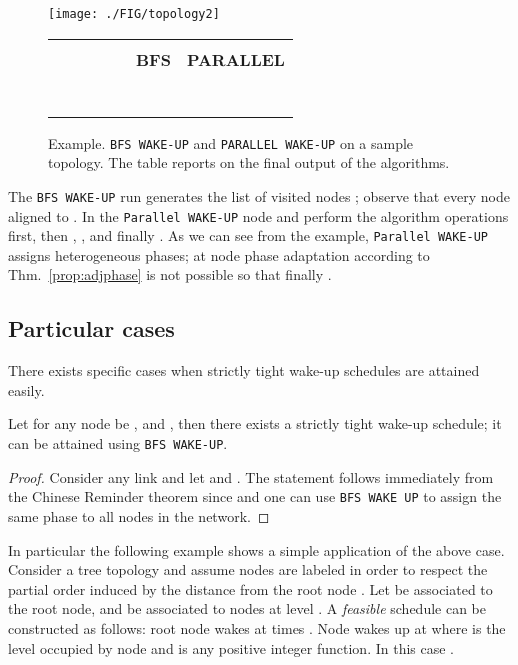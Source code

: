 \begin{figure*}[t]
\centering
\begin{minipage}{4cm}
\texttt{[image: ./FIG/topology2]}
\end{minipage}
\begin{minipage}{4cm}{\begin{tabular}{|l|c|c|c|c|c|c|}
\hline
\textbf{ } & \textbf{} & \textbf{}& \textbf{}& \textbf{}&\textbf{}& \textbf{}\\
&  &   & &  &\textbf{BFS} & \textbf{PARALLEL}\\
\hline
\hline
 &  & & &  &  & \\
 &  & & &  &  & \\
 &   & & & &  & \\
 &  & & &   &  & \\
 &   & & &  &  & \\
 &   & & &  &  & \\
 &   & & &  &  & \\
\hline
\end{tabular}
}\end{minipage}
\caption{Example. {\tt BFS WAKE-UP} and {\tt PARALLEL WAKE-UP} on a sample topology. The table reports on the final output of the algorithms.}\label{fig:example}
\end{figure*}

The {\tt BFS WAKE-UP} run generates the list of visited 
nodes ; observe that every node aligned to 
. In the {\tt Parallel WAKE-UP} node  and  perform 
 the algorithm operations first, then , ,  and finally . 
As we can see from the example, {\tt Parallel WAKE-UP} assigns 
heterogeneous phases; at node  phase adaptation according 
to Thm.~\ref{prop:adjphase} is not possible so that finally 
.


\subsection{Particular cases}\label{sec:particular}


There exists specific cases when strictly tight wake-up schedules are attained easily.
\begin{lem}
Let for any node  be ,  and , then there exists a strictly tight wake-up schedule; it can be attained
using {\tt BFS WAKE-UP}. 
\end{lem} 
\begin{proof}
Consider any link  and let  and . The statement follows immediately 
from the Chinese Reminder theorem since  and one can use 
{\tt BFS WAKE UP} to assign the same phase to all nodes in the network. 
\end{proof}

In particular the following example shows a simple application of the above
case. Consider a tree topology  and assume nodes are labeled in order to respect the partial order induced 
by the distance from the root node . Let  be associated to the root node, and  be associated 
to nodes at level . A {\em feasible} schedule can be constructed as follows: root node  wakes at times .
Node  wakes up at  where  is the level occupied by node  and  is any positive integer 
function. In this case .



